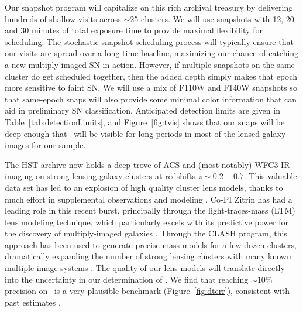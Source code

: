 Our snapshot program will capitalize on this rich archival treasury by
delivering hundreds of shallow visits across $\sim$25 clusters. We
will use snapshots with 12, 20 and 30 minutes of total exposure time
to provide maximal flexibility for scheduling.  The stochastic
snapshot scheduling process will typically ensure that our visits are
spread over a long time baseline, maximizing our chance of catching a
new multiply-imaged SN in action.  However, if multiple snapshots on
the same cluster do get scheduled together, then the added depth
simply makes that epoch more sensitive to faint SN.  We will use a mix
of F110W and F140W snapshots so that same-epoch snaps will also
provide some minimal color information that can aid in preliminary SN
classification.  Anticipated detection limits are given in
Table~\ref{tab:detectionLimits}, and Figure~\ref{fig:tvis} shows that
our snaps will be deep enough that \SNIa\ will be visible for long
periods in most of the lensed galaxy images for our sample.


The HST archive now holds a deep trove of ACS and (most notably)
WFC3-IR imaging on strong-lensing galaxy clusters at redshifts
$z\sim0.2-0.7$.  This valuable data set has led to an explosion of
high quality cluster lens models, thanks to much effort in
supplemental observations and modeling \citep[e.g.][]{Kneib:2004,
Smith:2005, Limousin:2008, Bradac:2008, Richard:2009}.  Co-PI Zitrin
has had a leading role in this recent burst, principally through the
light-traces-mass (LTM) lens modeling technique, which particularly
excels with its predictive power for the discovery of multiply-imaged
galaxies \citep{Broadhurst:2005, Zitrin:2009a}.  Through the CLASH
program, this approach has been used to generate precise mass models
for a few dozen clusters, dramatically expanding the number of strong
lensing clusters with many known multiple-image
systems \citep[e.g.][]{Zitrin:2009a, Zitrin:2009b, Zitrin:2011a,
Zitrin:2011b, Zitrin:2011c, Merten:2011, Zitrin:2012a, Zitrin:2012b,
Zitrin:2013a, Zitrin:2013b, Coe:2012, Coe:2013}.  The quality of our
lens models will translate directly into the uncertainty in our
determination of \Ho.  We find that reaching $\sim$10\% precision
on \Ho\ is a very plausible benchmark (Figure~\ref{fig:dterr}),
consistent with past
estimates \citep{Bolton:2003,Oguri:2003,Riehm:2011}.

